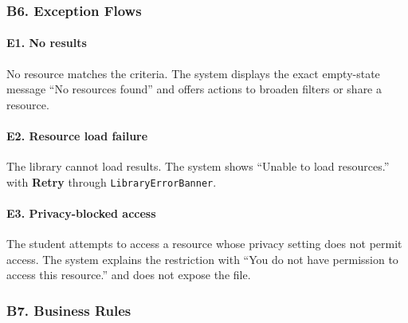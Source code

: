 \documentclass[12pt]{article}
\begin{document}
\hypertarget{sec:b6-exception-flows}{}
\subsubsection*{B6. Exception Flows}
\par\medskip

\hypertarget{sec:e1-no-results}{}
\paragraph*{E1. No results}
\par\medskip

No resource matches the criteria. The system displays the exact empty-state message “No resources found” and offers actions to broaden filters or share a resource.
\par\medskip

\hypertarget{sec:e2-resource-load-failure}{}
\paragraph*{E2. Resource load failure}
\par\medskip

The library cannot load results. The system shows “Unable to load resources.” with \textbf{Retry} through \texttt{LibraryErrorBanner}.
\par\medskip

\hypertarget{sec:e3-privacy-blocked-access}{}
\paragraph*{E3. Privacy-blocked access}
\par\medskip

The student attempts to access a resource whose privacy setting does not permit access. The system explains the restriction with “You do not have permission to access this resource.” and does not expose the file.
\par\medskip

\hypertarget{sec:b7-business-rules}{}
\subsubsection*{B7. Business Rules}
\par\medskip
\end{document}
